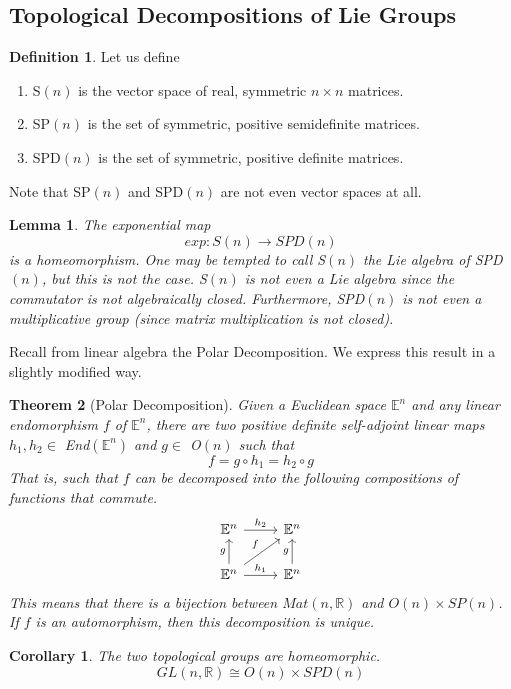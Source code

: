 \documentclass{article}
\newtheorem{theorem}{Theorem}[section]
\newtheorem{lemma}[theorem]{Lemma}
\newtheorem{corollary}{Corollary}[theorem]
\theoremstyle{remark}
\theoremstyle{definition}
\newtheorem{definition}{Definition}[section]
\begin{document}
\subsection{Topological Decompositions of Lie Groups}
\begin{definition}
Let us define 
\begin{enumerate}
    \item S$(n)$ is the vector space of real, symmetric $n \times n$ matrices. 
    \item SP$(n)$ is the set of symmetric, positive semidefinite matrices. 
    \item SPD$(n)$ is the set of symmetric, positive definite matrices. 
\end{enumerate}
Note that SP$(n)$ and SPD$(n)$ are not even vector spaces at all. 
\end{definition}

\begin{lemma}
The exponential map 
\[exp: S(n) \longrightarrow SPD(n)\]
is a homeomorphism. One may be tempted to call S$(n)$ the Lie algebra of SPD$(n)$, but this is not the case. S$(n)$ is not even a Lie algebra since the commutator is not algebraically closed. Furthermore, SPD$(n)$ is not even a multiplicative group (since matrix multiplication is not closed). 
\end{lemma}

Recall from linear algebra the Polar Decomposition. We express this result in a slightly modified way. 

\begin{theorem}[Polar Decomposition]
Given a Euclidean space $\mathbb{E}^n$ and any linear endomorphism $f$ of $\mathbb{E}^n$, there are two positive definite self-adjoint linear maps $h_1, h_2 \in$ End$(\mathbb{E}^n)$ and $g \in$ O$(n)$ such that
\[f = g \circ h_1 = h_2 \circ g\]
That is, such that $f$ can be decomposed into the following compositions of functions that commute. 
\[\begin{tikzcd}
\mathbb{E}^n \arrow{r}{h_2} & \mathbb{E}^n \\
\mathbb{E}^n \arrow{u}{g} \arrow{ur}{f} \arrow{r}{h_1} & \mathbb{E}^n \arrow{u}{g}
\end{tikzcd}\]
This means that there is a bijection between $Mat(n, \mathbb{R})$ and $O(n) \times SP(n)$. If $f$ is an automorphism, then this decomposition is unique. 
\end{theorem}

\begin{corollary}
The two topological groups are homeomorphic. 
\[GL(n, \mathbb{R}) \cong O(n) \times SPD(n)\]
\end{corollary}
\end{document}
